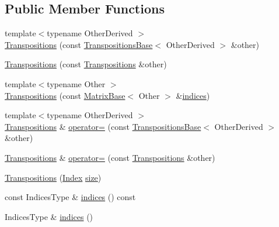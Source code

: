 \subsection*{Public Member Functions}
\begin{DoxyCompactItemize}
\item 
{\footnotesize template$<$typename Other\+Derived $>$ }\\\mbox{\hyperlink{class_eigen_1_1_transpositions_aae3eb58072f5b26f3851925eec5a006f}{Transpositions}} (const \mbox{\hyperlink{class_eigen_1_1_transpositions_base}{Transpositions\+Base}}$<$ Other\+Derived $>$ \&other)
\item 
\mbox{\hyperlink{class_eigen_1_1_transpositions_ace0b2d83863d5d433846c33292bb868c}{Transpositions}} (const \mbox{\hyperlink{class_eigen_1_1_transpositions}{Transpositions}} \&other)
\item 
{\footnotesize template$<$typename Other $>$ }\\\mbox{\hyperlink{class_eigen_1_1_transpositions_a415e07d885093f3f256394f59d4986f4}{Transpositions}} (const \mbox{\hyperlink{class_eigen_1_1_matrix_base}{Matrix\+Base}}$<$ Other $>$ \&\mbox{\hyperlink{class_eigen_1_1_transpositions_a786fd676c156124025aaf446d811d14f}{indices}})
\item 
{\footnotesize template$<$typename Other\+Derived $>$ }\\\mbox{\hyperlink{class_eigen_1_1_transpositions}{Transpositions}} \& \mbox{\hyperlink{class_eigen_1_1_transpositions_a991cbd0dcd647b414bbfdbacb642dbbd}{operator=}} (const \mbox{\hyperlink{class_eigen_1_1_transpositions_base}{Transpositions\+Base}}$<$ Other\+Derived $>$ \&other)
\item 
\mbox{\hyperlink{class_eigen_1_1_transpositions}{Transpositions}} \& \mbox{\hyperlink{class_eigen_1_1_transpositions_a9039acfbbd3e41402692142a96957bbe}{operator=}} (const \mbox{\hyperlink{class_eigen_1_1_transpositions}{Transpositions}} \&other)
\item 
\mbox{\hyperlink{class_eigen_1_1_transpositions_a6a02dae883f9bc072de3268e1696d0ba}{Transpositions}} (\mbox{\hyperlink{class_eigen_1_1_transpositions_base_a3f5f06118b419e8e6ccbe49ed5b4c91f}{Index}} \mbox{\hyperlink{class_eigen_1_1_transpositions_base_a6888d6261a9cc24ee8607496e610a5a3}{size}})
\item 
const Indices\+Type \& \mbox{\hyperlink{class_eigen_1_1_transpositions_a786fd676c156124025aaf446d811d14f}{indices}} () const
\item 
Indices\+Type \& \mbox{\hyperlink{class_eigen_1_1_transpositions_a678dfbd513871473bcd36bbc453eed8c}{indices}} ()
\end{DoxyCompactItemize}
